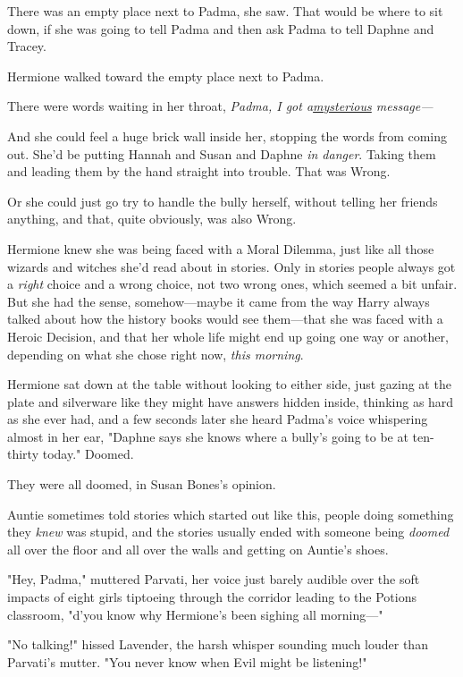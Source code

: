 There was an empty place next to Padma, she saw. That would be where to sit
down, if she was going to tell Padma and then ask Padma to tell Daphne and
Tracey.

Hermione walked toward the empty place next to Padma.

There were words waiting in her throat, \emph{Padma, I got a\underline{mysterious} message---}

And she could feel a huge brick wall inside her, stopping the words from coming
out. She'd be putting Hannah and Susan and Daphne \emph{in danger}. Taking them
and leading them by the hand straight into trouble. That was Wrong.

Or she could just go try to handle the bully herself, without telling her
friends anything, and that, quite obviously, was also Wrong.

Hermione knew she was being faced with a Moral Dilemma, just like all those
wizards and witches she'd read about in stories. Only in stories people always
got a \emph{right} choice and a wrong choice, not two wrong ones, which seemed
a bit unfair. But she had the sense, somehow---maybe it came from the way Harry
always talked about how the history books would see them---that she was faced
with a Heroic Decision, and that her whole life might end up going one way or
another, depending on what she chose right now, \emph{this morning}.

Hermione sat down at the table without looking to either side, just gazing at
the plate and silverware like they might have answers hidden inside, thinking
as hard as she ever had, and a few seconds later she heard Padma's voice
whispering almost in her ear, "Daphne says she knows where a bully's going to
be at ten-thirty today."
\later
Doomed.

They were all doomed, in Susan Bones's opinion.

Auntie sometimes told stories which started out like this, people doing
something they \emph{knew} was stupid, and the stories usually ended with
someone being \emph{doomed} all over the floor and all over the walls and
getting on Auntie's shoes.

"Hey, Padma," muttered Parvati, her voice just barely audible over the soft
impacts of eight girls tiptoeing through the corridor leading to the Potions
classroom, "d'you know why Hermione's been sighing all morning---"

"No talking!" hissed Lavender, the harsh whisper sounding much louder than
Parvati's mutter. "You never know when Evil might be listening!"

